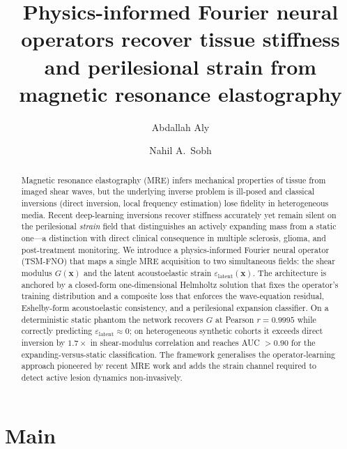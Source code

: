 \documentclass[11pt,letterpaper]{article}
\title{\bfseries
  Physics-informed Fourier neural operators recover tissue stiffness and
  perilesional strain from magnetic resonance elastography
}
\author[1]{Abdallah Aly}
\author[1,*]{Nahil A.\ Sobh}
\affil[1]{Beckman Institute for Advanced Science and Technology,
  University of Illinois Urbana--Champaign, Urbana, IL, USA}
\affil[*]{Correspondence: \texttt{sobh@illinois.edu}}
\date{}
\newcommand{\xvec}{\bm{x}}
\newcommand{\eps}{\varepsilon}
\newcommand{\epslat}{\eps_{\mathrm{latent}}}
\begin{document}
\maketitle

\begin{abstract}\noindent
Magnetic resonance elastography (MRE) infers mechanical properties of tissue
from imaged shear waves, but the underlying inverse problem is ill-posed and
classical inversions (direct inversion, local frequency estimation) lose
fidelity in heterogeneous media. Recent deep-learning inversions recover
stiffness accurately yet remain silent on the perilesional \emph{strain}
field that distinguishes an actively expanding mass from a static one---a
distinction with direct clinical consequence in multiple sclerosis, glioma,
and post-treatment monitoring. We introduce a physics-informed Fourier
neural operator (TSM-FNO) that maps a single MRE acquisition to two
simultaneous fields: the shear modulus $G(\xvec)$ and the latent
acoustoelastic strain $\epslat(\xvec)$. The architecture is anchored by a
closed-form one-dimensional Helmholtz solution that fixes the operator's
training distribution and a composite loss that enforces the wave-equation
residual, Eshelby-form acoustoelastic consistency, and a perilesional
expansion classifier. On a deterministic static phantom the network recovers
$G$ at Pearson $r=0.9995$ while correctly predicting $\epslat\!\approx\!0$;
on heterogeneous synthetic cohorts it exceeds direct inversion by $1.7\times$
in shear-modulus correlation and reaches AUC $>\!0.90$ for the
expanding-versus-static classification. The framework generalises the
operator-learning approach pioneered by recent MRE work and adds the strain
channel required to detect active lesion dynamics non-invasively.
\end{abstract}

\section*{Main}
\end{document}
